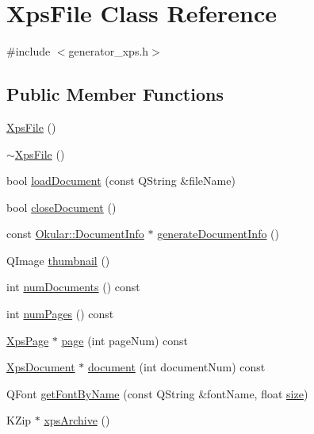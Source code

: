 \hypertarget{classXpsFile}{\section{Xps\+File Class Reference}
\label{classXpsFile}
}


{\ttfamily \#include $<$generator\+\_\+xps.\+h$>$}

\subsection*{Public Member Functions}
\begin{DoxyCompactItemize}
\item 
\hyperlink{classXpsFile_af1d98429b793f4c300387f1fac9b71c5}{Xps\+File} ()
\item 
\hyperlink{classXpsFile_a570d43ed80d3afc8934a8b9ca4e0fcec}{$\sim$\+Xps\+File} ()
\item 
bool \hyperlink{classXpsFile_ac38e167c31d825c4c39612e07c07b218}{load\+Document} (const Q\+String \&file\+Name)
\item 
bool \hyperlink{classXpsFile_a28bbd3f6d3334bdd088d1c93901d3049}{close\+Document} ()
\item 
const \hyperlink{classOkular_1_1DocumentInfo}{Okular\+::\+Document\+Info} $\ast$ \hyperlink{classXpsFile_a6608cc5b58a6c4a00441c2a04969c56c}{generate\+Document\+Info} ()
\item 
Q\+Image \hyperlink{classXpsFile_a7b4b16af19e4e691ed1639a8ea7e8fde}{thumbnail} ()
\item 
int \hyperlink{classXpsFile_ab807aabab0941dab3d6e5d4abbd6ae28}{num\+Documents} () const 
\item 
int \hyperlink{classXpsFile_a061f6c6030e14c87610de4d48738a3d8}{num\+Pages} () const 
\item 
\hyperlink{classXpsPage}{Xps\+Page} $\ast$ \hyperlink{classXpsFile_aabe5c767300a2c84a6b791ef8333007b}{page} (int page\+Num) const 
\item 
\hyperlink{classXpsDocument}{Xps\+Document} $\ast$ \hyperlink{classXpsFile_a365010f2c4cec6d1173b2fc4483df5b7}{document} (int document\+Num) const 
\item 
Q\+Font \hyperlink{classXpsFile_a3eaa64c752c7aa845409abb440e9eda0}{get\+Font\+By\+Name} (const Q\+String \&font\+Name, float \hyperlink{synctex__parser_8c_aa23c661441688350614bd6a350d2b6ff}{size})
\item 
K\+Zip $\ast$ \hyperlink{classXpsFile_a13a633163a15934693b3c65eae2a0c4f}{xps\+Archive} ()
\end{DoxyCompactItemize}


